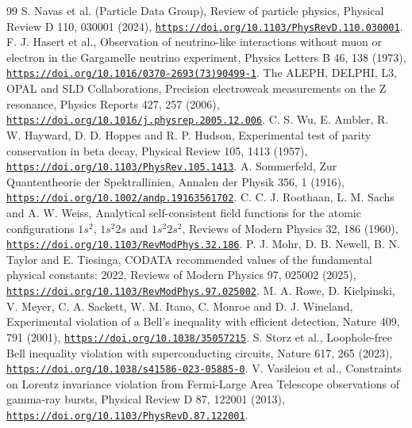 \documentclass[pdflatex,sn-mathphys-num]{sn-jnl}
\theoremstyle{thmstyleone}
\begin{document}
\begin{thebibliography}{99}
 S. Navas et al. (Particle Data Group), Review of particle physics, Physical Review D 110, 030001 (2024), \href{https://doi.org/10.1103/PhysRevD.110.030001}{\nolinkurl{https://doi.org/10.1103/PhysRevD.110.030001}}.
 F. J. Hasert et al., Observation of neutrino-like interactions without muon or electron in the Gargamelle neutrino experiment, Physics Letters B 46, 138 (1973), \href{https://doi.org/10.1016/0370-2693(73)90499-1}{\nolinkurl{https://doi.org/10.1016/0370-2693(73)90499-1}}.
 The ALEPH, DELPHI, L3, OPAL and SLD Collaborations, Precision electroweak measurements on the Z resonance, Physics Reports 427, 257 (2006), \href{https://doi.org/10.1016/j.physrep.2005.12.006}{\nolinkurl{https://doi.org/10.1016/j.physrep.2005.12.006}}.
 C. S. Wu, E. Ambler, R. W. Hayward, D. D. Hoppes and R. P. Hudson, Experimental test of parity conservation in beta decay, Physical Review 105, 1413 (1957), \href{https://doi.org/10.1103/PhysRev.105.1413}{\nolinkurl{https://doi.org/10.1103/PhysRev.105.1413}}.
 A. Sommerfeld, Zur Quantentheorie der Spektrallinien, Annalen der Physik 356, 1 (1916), \href{https://doi.org/10.1002/andp.19163561702}{\nolinkurl{https://doi.org/10.1002/andp.19163561702}}.
 C. C. J. Roothaan, L. M. Sachs and A. W. Weiss, Analytical self-consistent field functions for the atomic configurations $1s^2$, $1s^2 2s$ and $1s^2 2s^2$, Reviews of Modern Physics 32, 186 (1960), \href{https://doi.org/10.1103/RevModPhys.32.186}{\nolinkurl{https://doi.org/10.1103/RevModPhys.32.186}}.
 P. J. Mohr, D. B. Newell, B. N. Taylor and E. Tiesinga, CODATA recommended values of the fundamental physical constants: 2022, Reviews of Modern Physics 97, 025002 (2025), \href{https://doi.org/10.1103/RevModPhys.97.025002}{\nolinkurl{https://doi.org/10.1103/RevModPhys.97.025002}}.
 M. A. Rowe, D. Kielpinski, V. Meyer, C. A. Sackett, W. M. Itano, C. Monroe and D. J. Wineland, Experimental violation of a Bell's inequality with efficient detection, Nature 409, 791 (2001), \href{https://doi.org/10.1038/35057215}{\nolinkurl{https://doi.org/10.1038/35057215}}.
 S. Storz et al., Loophole-free Bell inequality violation with superconducting circuits, Nature 617, 265 (2023), \href{https://doi.org/10.1038/s41586-023-05885-0}{\nolinkurl{https://doi.org/10.1038/s41586-023-05885-0}}.
 V. Vasileiou et al., Constraints on Lorentz invariance violation from Fermi-Large Area Telescope observations of gamma-ray bursts, Physical Review D 87, 122001 (2013), \href{https://doi.org/10.1103/PhysRevD.87.122001}{\nolinkurl{https://doi.org/10.1103/PhysRevD.87.122001}}.

\end{thebibliography}
\end{document}
